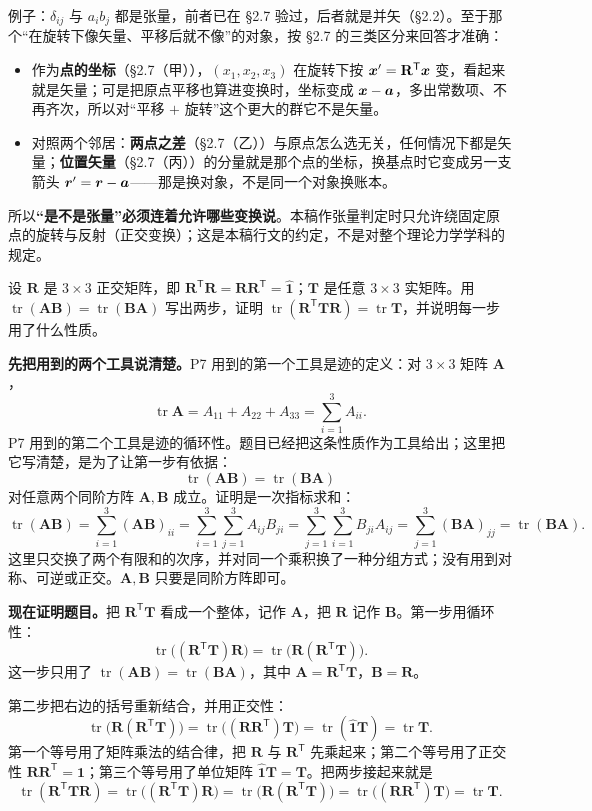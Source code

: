 \documentclass[11pt]{ctexart}
\newcommand{\ten}[1]{\mathbf{#1}}
\newcommand{\unitd}{\hat{\ten{1}}}
\newcommand{\tr}{\operatorname{tr}}
\begin{document}
例子：$\delta_{ij}$ 与 $a_ib_j$ 都是张量，前者已在 \S2.7 验过，后者就是并矢（\S2.2）。至于那个“在旋转下像矢量、平移后就不像”的对象，按 \S2.7 的三类区分来回答才准确：
\begin{itemize}[leftmargin=1.8em,itemsep=2pt]
\item 作为\textbf{点的坐标}（\S2.7（甲）），$(x_1,x_2,x_3)$ 在旋转下按 $\vect x'=\ten R^{\mathsf T}\vect x$ 变，看起来就是矢量；可是把原点平移也算进变换时，坐标变成 $\boldsymbol{x}-\boldsymbol{a}$，多出常数项、不再齐次，所以对“平移 $+$ 旋转”这个更大的群它不是矢量。
\item 对照两个邻居：\textbf{两点之差}（\S2.7（乙））与原点怎么选无关，任何情况下都是矢量；\textbf{位置矢量}（\S2.7（丙））的分量就是那个点的坐标，换基点时它变成另一支箭头 $\boldsymbol{r}'=\boldsymbol{r}-\boldsymbol{a}$——那是换对象，不是同一个对象换账本。
\end{itemize}
所以\textbf{“是不是张量”必须连着允许哪些变换说}。本稿作张量判定时只允许绕固定原点的旋转与反射（正交变换）；这是本稿行文的约定，不是对整个理论力学学科的规定。

{设 $\ten R$ 是 $3\times3$ 正交矩阵，即 $\ten R^{\mathsf T}\ten R=\ten R\ten R^{\mathsf T}=\unitd$；$\ten T$ 是任意 $3\times3$ 实矩阵。用 $\tr(\ten A\ten B)=\tr(\ten B\ten A)$ 写出两步，证明 $\tr(\ten R^{\mathsf T}\ten T\ten R)=\tr\ten T$，并说明每一步用了什么性质。}

\textbf{先把用到的两个工具说清楚。}P7 用到的第一个工具是迹的定义：对 $3\times3$ 矩阵 $\ten A$，
\[
\tr\ten A=A_{11}+A_{22}+A_{33}=\sum_{i=1}^{3}A_{ii}.
\]
P7 用到的第二个工具是迹的循环性。题目已经把这条性质作为工具给出；这里把它写清楚，是为了让第一步有依据：
\[
\tr(\ten A\ten B)=\tr(\ten B\ten A)
\]
对任意两个同阶方阵 $\ten A,\ten B$ 成立。证明是一次指标求和：
\[
\tr(\ten A\ten B)
=\sum_{i=1}^{3}(\ten A\ten B)_{ii}
=\sum_{i=1}^{3}\sum_{j=1}^{3}A_{ij}B_{ji}
=\sum_{j=1}^{3}\sum_{i=1}^{3}B_{ji}A_{ij}
=\sum_{j=1}^{3}(\ten B\ten A)_{jj}
=\tr(\ten B\ten A).
\]
这里只交换了两个有限和的次序，并对同一个乘积换了一种分组方式；没有用到对称、可逆或正交。$\ten A,\ten B$ 只要是同阶方阵即可。

\textbf{现在证明题目。}把 $\ten R^{\mathsf T}\ten T$ 看成一个整体，记作 $\ten A$，把 $\ten R$ 记作 $\ten B$。第一步用循环性：
\[
\tr\bigl((\ten R^{\mathsf T}\ten T)\ten R\bigr)
=\tr\bigl(\ten R(\ten R^{\mathsf T}\ten T)\bigr).
\]
这一步只用了 $\tr(\ten A\ten B)=\tr(\ten B\ten A)$，其中 $\ten A=\ten R^{\mathsf T}\ten T$，$\ten B=\ten R$。

第二步把右边的括号重新结合，并用正交性：
\[
\tr\bigl(\ten R(\ten R^{\mathsf T}\ten T)\bigr)
=\tr\bigl((\ten R\ten R^{\mathsf T})\ten T\bigr)
=\tr(\unitd\ten T)
=\tr\ten T .
\]
第一个等号用了矩阵乘法的结合律，把 $\ten R$ 与 $\ten R^{\mathsf T}$ 先乘起来；第二个等号用了正交性 $\ten R\ten R^{\mathsf T}=\unitd$；第三个等号用了单位矩阵 $\unitd\ten T=\ten T$。把两步接起来就是
\[
\tr(\ten R^{\mathsf T}\ten T\ten R)
=\tr\bigl((\ten R^{\mathsf T}\ten T)\ten R\bigr)
=\tr\bigl(\ten R(\ten R^{\mathsf T}\ten T)\bigr)
=\tr\bigl((\ten R\ten R^{\mathsf T})\ten T\bigr)
=\tr\ten T .
\]
\end{document}
